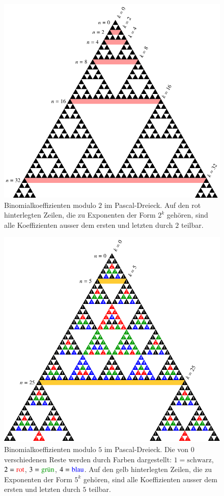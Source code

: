 \begin{figure}
\centering
\includegraphics{chapters/30-endlichekoerper/images/binomial2.pdf}
\caption{Binomialkoeffizienten modulo $2$ im Pascal-Dreieck.
Auf den rot hinterlegten Zeilen, die zu Exponenten der Form $2^k$ gehören,
sind alle Koeffizienten ausser dem ersten und letzten durch $2$ teilbar.
\label{buch:endliche-koerper:fig:binomial2}}
\end{figure}
\bgroup

\begin{figure}
\centering
\includegraphics{chapters/30-endlichekoerper/images/binomial5.pdf}
\caption{Binomialkoeffizienten modulo $5$ im Pascal-Dreieck.
Die von $0$ verschiedenen Reste werden durch Farben dargestellt:
$1=\text{schwarz}$,
$2=\text{\color{farbe2}rot}$,
$3=\text{\color{farbe3}grün}$,
$4=\text{\color{farbe4}blau}$.
Auf den gelb hinterlegten Zeilen, die zu Exponenten der Form $5^k$ gehören,
sind alle Koeffizienten ausser dem ersten und letzten durch $5$ teilbar.
\label{buch:endliche-koerper:fig:binomial5}}
\end{figure}
